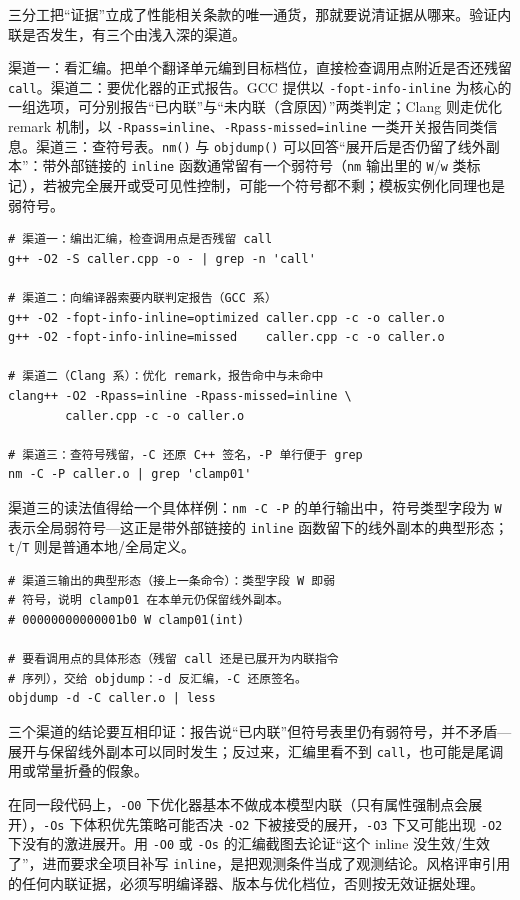 \documentclass[12pt,a4paper,fontset=fandol]{ctexbook}
\newcommand{\Fn}[1]{\texttt{#1()}}
\newcommand{\Tp}[1]{\texttt{#1}}
\newcommand{\Bk}{\discretionary{}{}{}}
\begin{document}
三分工把``证据''立成了性能相关条款的唯一通货，那就要说清证据从哪来。验证内联是否发生，有三个由浅入深的渠道。

渠道一：看汇编。把单个翻译单元编到目标档位，直接检查调用点附近是否还残留 \Tp{call}。渠道二：要优化器的正式报告。GCC 提供以 \Tp{-fopt-info-inline} 为核心的一组选项，可分别报告``已内联''与``未内联（含原因）''两类判定；Clang 则走优化 remark 机制，以 \Tp{-Rpass=inline}、\Tp{-Rpass-missed=inline} 一类开关报告同类信息。渠道三：查符号表。\Fn{nm} 与 \Fn{objdump} 可以回答``展开后是否仍留了线外副本''：带外部链接的 \Tp{inline} 函数通常留有一个弱符号（\Tp{nm} 输出里的 \Tp{W}/{\Bk}\Tp{w} 类标记），若被完全展开或受可见性控制，可能一个符号都不剩；模板实例化同理也是弱符号。

\begin{lstlisting}[style=shellstyle]
# 渠道一：编出汇编，检查调用点是否残留 call
g++ -O2 -S caller.cpp -o - | grep -n 'call'

# 渠道二：向编译器索要内联判定报告（GCC 系）
g++ -O2 -fopt-info-inline=optimized caller.cpp -c -o caller.o
g++ -O2 -fopt-info-inline=missed    caller.cpp -c -o caller.o

# 渠道二（Clang 系）：优化 remark，报告命中与未命中
clang++ -O2 -Rpass=inline -Rpass-missed=inline \
        caller.cpp -c -o caller.o

# 渠道三：查符号残留，-C 还原 C++ 签名，-P 单行便于 grep
nm -C -P caller.o | grep 'clamp01'
\end{lstlisting}

渠道三的读法值得给一个具体样例：\Tp{nm -C -P} 的单行输出中，符号类型字段为 \Tp{W} 表示全局弱符号---这正是带外部链接的 \Tp{inline} 函数留下的线外副本的典型形态；\Tp{t}/{\Bk}\Tp{T} 则是普通本地/全局定义。

\begin{lstlisting}[style=shellstyle]
# 渠道三输出的典型形态（接上一条命令）：类型字段 W 即弱
# 符号，说明 clamp01 在本单元仍保留线外副本。
# 00000000000001b0 W clamp01(int)

# 要看调用点的具体形态（残留 call 还是已展开为内联指令
# 序列），交给 objdump：-d 反汇编，-C 还原签名。
objdump -d -C caller.o | less
\end{lstlisting}

三个渠道的结论要互相印证：报告说``已内联''但符号表里仍有弱符号，并不矛盾---展开与保留线外副本可以同时发生；反过来，汇编里看不到 \Tp{call}，也可能是尾调用或常量折叠的假象。

\begin{warning}[title={档位不同，结论可以完全相反}]
在同一段代码上，\Tp{-O0} 下优化器基本不做成本模型内联（只有属性强制点会展开），\Tp{-Os} 下体积优先策略可能否决 \Tp{-O2} 下被接受的展开，\Tp{-O3} 下又可能出现 \Tp{-O2} 下没有的激进展开。用 \Tp{-O0} 或 \Tp{-Os} 的汇编截图去论证``这个 inline 没生效/生效了''，进而要求全项目补写 \Tp{inline}，是把观测条件当成了观测结论。风格评审引用的任何内联证据，必须写明编译器、版本与优化档位，否则按无效证据处理。
\end{warning}
\end{document}
